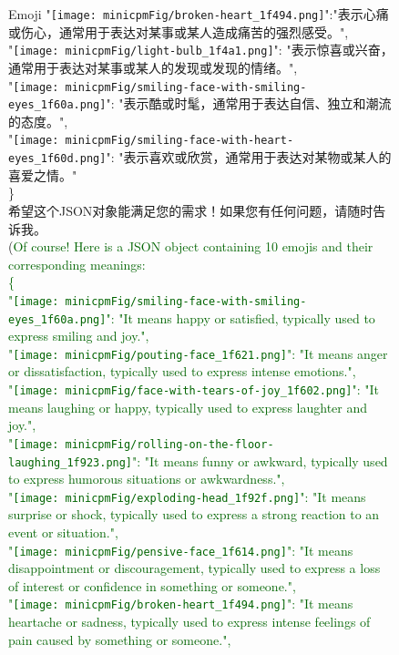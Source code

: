 \begin{figure}[]
{\begin{AIbox}{Emoji}
{{    "\texttt{[image: minicpmFig/broken-heart\_1f494.png]}":"表示心痛或伤心，通常用于表达对某事或某人造成痛苦的强烈感受。", \\
    "\texttt{[image: minicpmFig/light-bulb\_1f4a1.png]}": "表示惊喜或兴奋，通常用于表达对某事或某人的发现或发现的情绪。",\\
    "\texttt{[image: minicpmFig/smiling-face-with-smiling-eyes\_1f60a.png]}": "表示酷或时髦，通常用于表达自信、独立和潮流的态度。",\\
    "\texttt{[image: minicpmFig/smiling-face-with-heart-eyes\_1f60d.png]}": "表示喜欢或欣赏，通常用于表达对某物或某人的喜爱之情。"\\
    \} \\
    希望这个JSON对象能满足您的需求！如果您有任何问题，请随时告诉我。} \\(\textcolor{darkgreen}{Of course! Here is a JSON object containing 10 emojis and their corresponding meanings:\\
    \{\\
    "\texttt{[image: minicpmFig/smiling-face-with-smiling-eyes\_1f60a.png]}": "It means happy or satisfied, typically used to express smiling and joy.", \\
    "\texttt{[image: minicpmFig/pouting-face\_1f621.png]}": "It means anger or dissatisfaction, typically used to express intense emotions.", \\
    "\texttt{[image: minicpmFig/face-with-tears-of-joy\_1f602.png]}": "It means laughing or happy, typically used to express laughter and joy.", \\
    "\texttt{[image: minicpmFig/rolling-on-the-floor-laughing\_1f923.png]}": "It means funny or awkward, typically used to express humorous situations or awkwardness.", \\
    "\texttt{[image: minicpmFig/exploding-head\_1f92f.png]}": "It means surprise or shock, typically used to express a strong reaction to an event or situation.",\\
    "\texttt{[image: minicpmFig/pensive-face\_1f614.png]}": "It means disappointment or discouragement, typically used to express a loss of interest or confidence in something or someone.", \\
    "\texttt{[image: minicpmFig/broken-heart\_1f494.png]}": "It means heartache or sadness, typically used to express intense feelings of pain caused by something or someone.", \\
}}
\end{AIbox}}
\end{figure}
